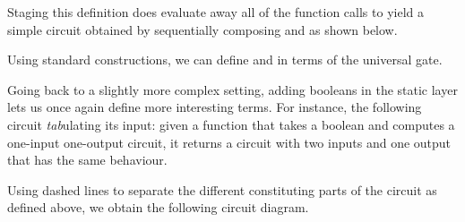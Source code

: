 Staging this definition does evaluate away all of the function
calls to yield a simple circuit obtained by sequentially
composing  and  as shown below.


Using standard constructions, we can define  and 
in terms of the universal  gate.

\noindent
\begin{minipage}{.22\textwidth}
\end{minipage}\hfill
\begin{minipage}{.22\textwidth}
\end{minipage}

Going back to a slightly more complex setting, adding booleans in the
static layer lets us once again define more interesting terms.
For instance, the following  circuit \emph{tab}ulating its
input: given a function that takes a boolean and computes a one-input
one-output circuit, it returns a circuit with two inputs and one
output that has the same behaviour.


Using dashed lines to separate the different constituting parts
of the circuit as defined above, we obtain the following circuit
diagram.

